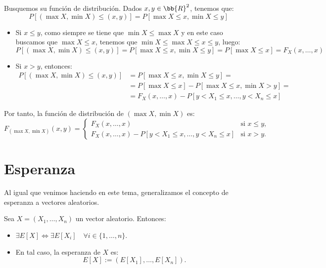 Busquemos su función de distribución. Dados $x,y\in \bb{R}^2$, tenemos que:
\begin{equation*}
    P[(\max X, \min X)\leq (x,y)] = P[\max X\leq x, \min X\leq y]
\end{equation*}
\begin{itemize}
    \item Si $x\leq y$, como siempre se tiene que $\min X\leq \max X$ y en este caso buscamos que $\max X\leq x$, tenemos que $\min X\leq \max X\leq x\leq y$, luego:
    \begin{equation*}
        P[(\max X, \min X)\leq (x,y)] = P[\max X\leq x, \min X\leq y] = P[\max X\leq x] = F_X(x,\dots,x)
    \end{equation*}

    \item Si $x>y$, entonces:
    \begin{align*}
        P[(\max X, \min X)\leq (x,y)] &= P[\max X\leq x, \min X\leq y] =\\&= P[\max X\leq x] - P[\max X\leq x,\min X> y] =\\&= F_X(x,\dots,x) - P[y<X_1\leq x,\dots,y<X_n\leq x]
    \end{align*}
\end{itemize}

Por tanto, la función de distribución de $(\max X, \min X)$ es:
\begin{equation*}
    F_{(\max X, \min X)}(x,y) = \begin{cases}
        F_X(x,\dots,x) & \text{si } x\leq y,\\
        F_X(x,\dots,x) - P[y<X_1\leq x,\dots,y<X_n\leq x] & \text{si } x>y.
    \end{cases}
\end{equation*}



\section{Esperanza}

Al igual que venimos haciendo en este tema, generalizamos el concepto de esperanza a vectores aleatorios.
\begin{definicion}[Esperanza]
    Sea $X=(X_1,\dots,X_n)$ un vector aleatorio. Entonces:
    \begin{itemize}
        \item $\exists E[X]\Longleftrightarrow \exists E[X_i] \quad \forall i\in \{1,\dots,n\}$.
        \item En tal caso, la esperanza de $X$ es:
        \begin{equation*}
            E[X] := (E[X_1],\dots,E[X_n]).
        \end{equation*}
    \end{itemize}
\end{definicion}


